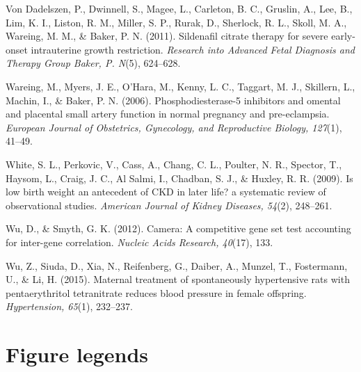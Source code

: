 \documentclass[authordate, empirical,issue]{jote-new-article}
\begin{document}
Von Dadelszen, P., Dwinnell, S., Magee, L., Carleton, B. C., Gruslin, A., Lee, B., Lim, K. I., Liston, R. M., Miller, S. P., Rurak, D., Sherlock, R. L., Skoll, M. A., Wareing, M. M., \& Baker, P. N. (2011). Sildenafil citrate therapy for severe early-onset intrauterine growth restriction. \emph{Research into Advanced Fetal Diagnosis and Therapy Group Baker, P. N}(5), 624–628.

Wareing, M., Myers, J. E., O’Hara, M., Kenny, L. C., Taggart, M. J., Skillern, L., Machin, I., \& Baker, P. N. (2006). Phosphodiesterase-5 inhibitors and omental and placental small artery function in normal pregnancy and pre-eclampsia. \emph{European Journal of Obstetrics, Gynecology, and Reproductive Biology, 127}(1), 41–49.

White, S. L., Perkovic, V., Cass, A., Chang, C. L., Poulter, N. R., Spector, T., Haysom, L., Craig, J. C., Al Salmi, I., Chadban, S. J., \& Huxley, R. R. (2009). Is low birth weight an antecedent of CKD in later life? a systematic review of observational studies. \emph{American Journal of Kidney Diseases, 54}(2), 248–261.

Wu, D., \& Smyth, G. K. (2012). Camera: A competitive gene set test accounting for inter-gene correlation. \emph{Nucleic Acids Research, 40}(17), 133.

Wu, Z., Siuda, D., Xia, N., Reifenberg, G., Daiber, A., Munzel, T., Fostermann, U., \& Li, H. (2015). Maternal treatment of spontaneously hypertensive rats with pentaerythritol tetranitrate reduces blood pressure in female offspring. \emph{Hypertension, 65}(1), 232–237.




\clearpage
\onecolumn
\section{Figure legends}
\end{document}
